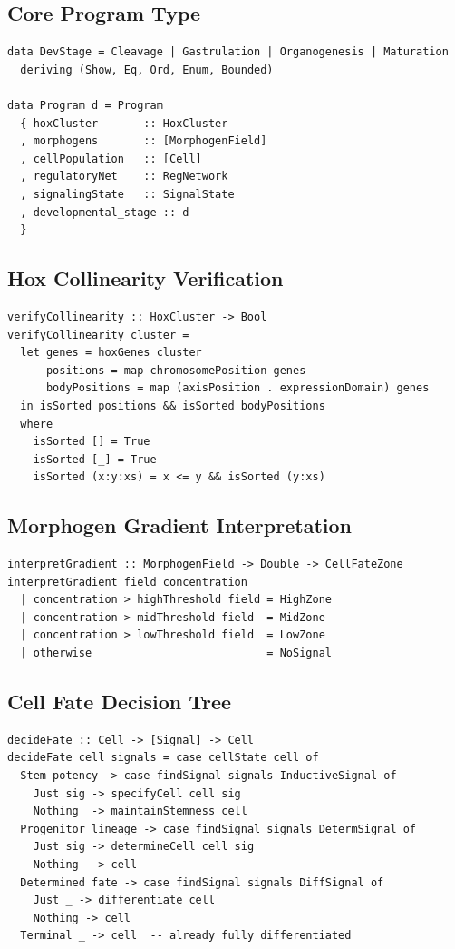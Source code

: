 \documentclass[12pt,a4paper]{article}
\begin{document}
\subsection{Core Program Type}

\begin{lstlisting}
data DevStage = Cleavage | Gastrulation | Organogenesis | Maturation
  deriving (Show, Eq, Ord, Enum, Bounded)

data Program d = Program
  { hoxCluster       :: HoxCluster
  , morphogens       :: [MorphogenField]
  , cellPopulation   :: [Cell]
  , regulatoryNet    :: RegNetwork
  , signalingState   :: SignalState
  , developmental_stage :: d
  }
\end{lstlisting}

\subsection{Hox Collinearity Verification}

\begin{lstlisting}
verifyCollinearity :: HoxCluster -> Bool
verifyCollinearity cluster =
  let genes = hoxGenes cluster
      positions = map chromosomePosition genes
      bodyPositions = map (axisPosition . expressionDomain) genes
  in isSorted positions && isSorted bodyPositions
  where
    isSorted [] = True
    isSorted [_] = True
    isSorted (x:y:xs) = x <= y && isSorted (y:xs)
\end{lstlisting}

\subsection{Morphogen Gradient Interpretation}

\begin{lstlisting}
interpretGradient :: MorphogenField -> Double -> CellFateZone
interpretGradient field concentration
  | concentration > highThreshold field = HighZone
  | concentration > midThreshold field  = MidZone
  | concentration > lowThreshold field  = LowZone
  | otherwise                           = NoSignal
\end{lstlisting}

\subsection{Cell Fate Decision Tree}

\begin{lstlisting}
decideFate :: Cell -> [Signal] -> Cell
decideFate cell signals = case cellState cell of
  Stem potency -> case findSignal signals InductiveSignal of
    Just sig -> specifyCell cell sig
    Nothing  -> maintainStemness cell
  Progenitor lineage -> case findSignal signals DetermSignal of
    Just sig -> determineCell cell sig
    Nothing  -> cell
  Determined fate -> case findSignal signals DiffSignal of
    Just _ -> differentiate cell
    Nothing -> cell
  Terminal _ -> cell  -- already fully differentiated
\end{lstlisting}
\end{document}
